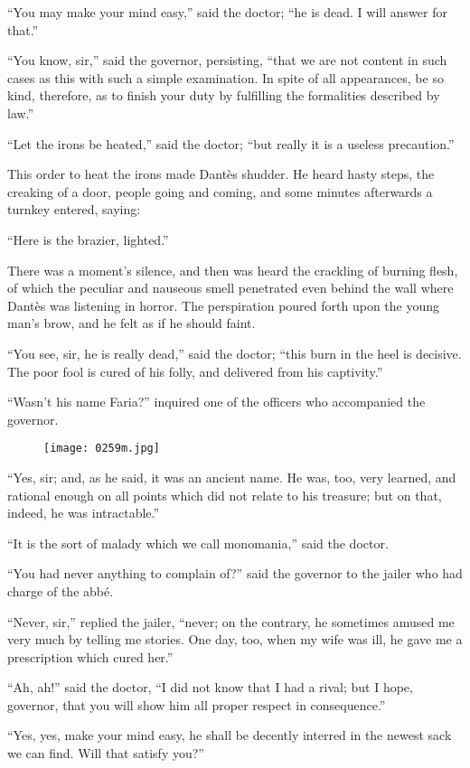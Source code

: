 “You may make your mind easy,” said the doctor; “he is dead. I will
answer for that.”

“You know, sir,” said the governor, persisting, “that we are not
content in such cases as this with such a simple examination. In spite
of all appearances, be so kind, therefore, as to finish your duty by
fulfilling the formalities described by law.”

“Let the irons be heated,” said the doctor; “but really it is a useless
precaution.”

This order to heat the irons made Dantès shudder. He heard hasty steps,
the creaking of a door, people going and coming, and some minutes
afterwards a turnkey entered, saying:

“Here is the brazier, lighted.”

There was a moment’s silence, and then was heard the crackling of
burning flesh, of which the peculiar and nauseous smell penetrated even
behind the wall where Dantès was listening in horror. The perspiration
poured forth upon the young man’s brow, and he felt as if he should
faint.

“You see, sir, he is really dead,” said the doctor; “this burn in the
heel is decisive. The poor fool is cured of his folly, and delivered
from his captivity.”

“Wasn’t his name Faria?” inquired one of the officers who accompanied
the governor.

\begin{figure}[ht]
\texttt{[image: 0259m.jpg]}
\end{figure}

“Yes, sir; and, as he said, it was an ancient name. He was, too, very
learned, and rational enough on all points which did not relate to his
treasure; but on that, indeed, he was intractable.”

“It is the sort of malady which we call monomania,” said the doctor.

“You had never anything to complain of?” said the governor to the
jailer who had charge of the abbé.

“Never, sir,” replied the jailer, “never; on the contrary, he sometimes
amused me very much by telling me stories. One day, too, when my wife
was ill, he gave me a prescription which cured her.”

“Ah, ah!” said the doctor, “I did not know that I had a rival; but I
hope, governor, that you will show him all proper respect in
consequence.”

“Yes, yes, make your mind easy, he shall be decently interred in the
newest sack we can find. Will that satisfy you?”

